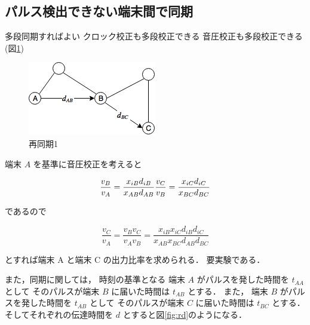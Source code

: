 \subsection{パルス検出できない端末間で同期}
多段同期すればよい
クロック校正も多段校正できる
音圧校正も多段校正できる(図\ref{fig:nt})

\begin{figure}[p]
  \centering
  \includegraphics[clip,width=1.05\hsize]{img/network_topology.png}
  \caption{再同期1}\label{fig:nt}
\end{figure}



端末 $A$ を基準に音圧校正を考えると

$$
\frac{v_B}{v_A} = \frac{x_{iB} d_{iB}}{x_{AB}d_{AB}} \\
\frac{v_C}{v_B} = \frac{x_{iC} d_{iC}}{x_{BC}d_{BC}} \\
$$

であるので

$$
\frac{v_C}{v_A} =
\frac{v_B v_C}{v_A v_B} =
\frac{x_{iB} x_{iC} d_{iB} d_{iC}}{x_{AB} x_{BC} d_{AB} d_{BC}}
$$

とすれば端末 A と端末 C の出力比率を求められる．
要実験である．

また，同期に関しては，
時刻の基準となる
端末 $A$ がパルスを発した時間を $t_{AA}$ として
そのパルスが端末 $B$ に届いた時間は $t_{AB}$ とする．
また，
端末 $B$ がパルスを発した時間を $t_{AB}$ として
そのパルスが端末 $C$ に届いた時間は $t_{BC}$ とする．
そしてそれぞれの伝達時間を $d$ とすると図\ref{fig:rd}のようになる．


